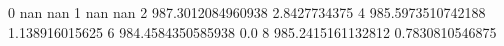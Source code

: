 0 nan nan
1 nan nan
2 987.3012084960938 2.8427734375
4 985.5973510742188 1.138916015625
6 984.4584350585938 0.0
8 985.2415161132812 0.7830810546875
